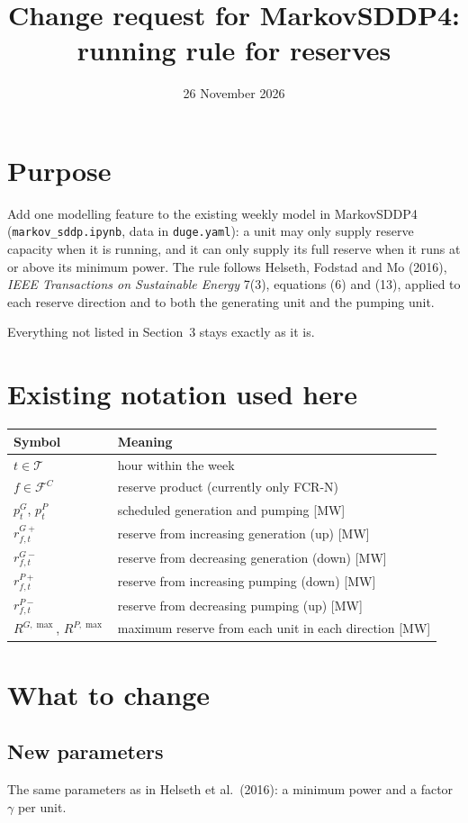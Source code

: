 \documentclass[11pt,a4paper]{article}
\title{Change request for MarkovSDDP4:\\ running rule for reserves}
\author{}
\date{26 November 2026}
\begin{document}
\maketitle

\section{Purpose}
Add one modelling feature to the existing weekly model in MarkovSDDP4
(\texttt{markov\_sddp.ipynb}, data in \texttt{duge.yaml}): a unit may only
supply reserve capacity when it is running, and it can only supply its full
reserve when it runs at or above its minimum power. The rule follows
Helseth, Fodstad and Mo (2016), \emph{IEEE Transactions on Sustainable
Energy} 7(3), equations (6) and (13), applied to each reserve direction and
to both the generating unit and the pumping unit.

Everything not listed in Section~3 stays exactly as it is.

\section{Existing notation used here}
\begin{tabular}{@{}ll@{}}
\toprule
Symbol & Meaning\\
\midrule
$t\in\mathcal T$ & hour within the week\\
$f\in\mathcal F^C$ & reserve product (currently only FCR-N)\\
$p^G_t$, $p^P_t$ & scheduled generation and pumping [MW]\\
$r^{G+}_{f,t}$ & reserve from increasing generation (up) [MW]\\
$r^{G-}_{f,t}$ & reserve from decreasing generation (down) [MW]\\
$r^{P+}_{f,t}$ & reserve from increasing pumping (down) [MW]\\
$r^{P-}_{f,t}$ & reserve from decreasing pumping (up) [MW]\\
$R^{G,\max}$, $R^{P,\max}$ & maximum reserve from each unit in each direction [MW]\\
\bottomrule
\end{tabular}

\section{What to change}

\subsection{New parameters}
The same parameters as in Helseth et al.\ (2016): a minimum power and a
factor $\gamma$ per unit.
\end{document}
